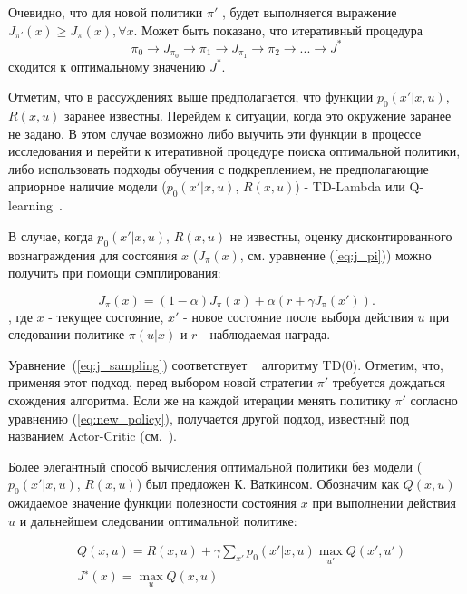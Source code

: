 Очевидно, что для новой политики $\pi'$ , будет выполняется выражение $J_{\pi'}(x) \geq J_\pi(x), \forall x$. Может быть показано, что итеративный процедура $$\pi_0 \rightarrow J_{\pi_0} \rightarrow \pi_1 \rightarrow J_{\pi_1} \rightarrow \pi_2 \rightarrow ... \rightarrow J^*$$ сходится  к оптимальному значению $J^*$.

Отметим, что в рассуждениях выше предполагается, что функции $p_0(x'|x,u)$, $R(x,u)$ заранее известны. Перейдем к ситуации, когда это окружение заранее не задано. В этом случае возможно либо выучить эти функции в процессе исследования и перейти к итеративной процедуре поиска оптимальной политики, либо использовать подходы обучения с подкреплением, не предполагающие априорное наличие модели ($p_0(x'|x,u)$, $R(x,u)$) - TD-Lambda \cite{sutton1998reinforcement} или Q-learning~\cite{Watkins:1989}.

В случае, когда $p_0(x'|x,u)$, $R(x,u)$ не известны, оценку дисконтированного вознаграждения для состояния $x$ ($J_\pi(x)$, см. уравнение (\ref{eq:j_pi})) можно получить при помощи сэмплирования:

\begin{equation}
    \label{eq:j_sampling}
   	J_\pi(x) = (1-\alpha)J_\pi(x) + \alpha(r + \gamma J_\pi(x')).
\end{equation}
, где $x$ - текущее состояние, $x'$ - новое состояние после выбора действия $u$ при следовании политике $\pi(u|x)$ и $r$ - наблюдаемая награда.

Уравнение~(\ref{eq:j_sampling}) соответствует ~\cite{sutton1998reinforcement} алгоритму TD(0). Отметим, что, применяя этот подход, перед выбором новой стратегии $\pi'$ требуется дождаться схождения алгоритма. Если же на каждой итерации менять политику $\pi'$ согласно уравнению (\ref{eq:new_policy}), получается другой подход, известный под названием Actor-Critic (см.~\cite{actor_critic}).

Более элегантный способ вычисления оптимальной политики без модели ($p_0(x'|x,u)$, $R(x,u)$) был предложен \cite{Watkins:1989} К. Ваткинсом. Обозначим как $Q(x, u)$ ожидаемое значение функции полезности состояния $x$ при выполнении действия $u$ и дальнейшем следовании оптимальной политике:

\begin{equation}
    \label{eq:q_learning_definition}
    \begin{split}
      & Q(x, u) = R(x, u) + \gamma \sum_{x'} {
          p_0(x'|x, u) \max_{u'} Q(x', u')
       }
       \\
      & J^{∗}(x) = \max_{u} Q(x,u)
     \end{split}
\end{equation}


